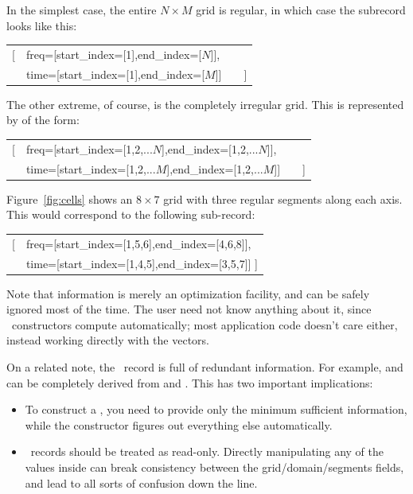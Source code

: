 \documentclass[10pt,twoside]{book}
\begin{document}
  In the simplest case, the entire $N\times M$ grid is regular, in which case the
   subrecord looks like this:
 
  {\tt\begin{tabular}{ll}
  [&freq=[start\_index=[1],end\_index=[$N$]],\\
  &time=[start\_index=[1],end\_index=[$M$]]~~~~]\\
  \end{tabular}}
  
  The other extreme, of course, is the completely irregular grid. This is
  represented by  of the form:

  {\tt\begin{tabular}{ll}
  [&freq=[start\_index=[1,2,$...N$],end\_index=[1,2,$...N$]],\\
  &time=[start\_index=[1,2,$...M$],end\_index=[1,2,$...M$]]~~~~]
  \end{tabular}}
  
  Figure~\ref{fig:cells} shows an $8\times7$ grid with three regular segments
  along each axis. This would correspond to the following 
  sub-record:

  {\tt\begin{tabular}{ll}
  [&freq=[start\_index=[1,5,6],end\_index=[4,6,8]],\\
   &time=[start\_index=[1,4,5],end\_index=[3,5,7]] ]
  \end{tabular}}
  
  Note that  information is merely an optimization facility, and
  can be safely ignored most of the time. The user need not know anything about
  it, since \Cells\ constructors compute  automatically; most
  application code doesn't care either, instead working directly with the
   vectors. 

  On a related note, the \Cells\ record is full of redundant information. For
  example,  and  can be completely derived from
   and . This has two important implications:
  
  \begin{itemize}
  
  \item To construct a \Cells, you need to provide only the minimum sufficient
  information, while the constructor figures out everything else automatically.

  \item \Cells\ records should be treated as read-only. Directly manipulating 
  any of the values inside can break consistency between the
  grid/domain/segments fields, and lead to all sorts of confusion down
  the line.

  \end{itemize}
  
\end{document}
